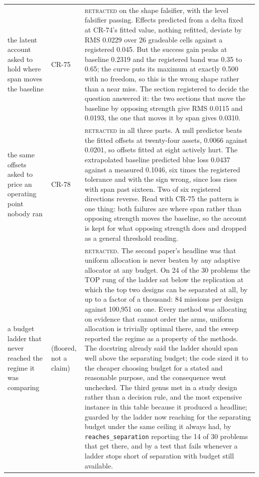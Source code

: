 \begin{tabular}{@{}p{}p{}p{}@{}}
the latent account asked to hold where span moves the baseline & CR-75 & \textsc{retracted} on the shape falsifier, with the level falsifier passing. Effects predicted from a delta fixed at CR-74's fitted value, nothing refitted, deviate by RMS 0.0229 over 26 gradeable cells against a registered 0.045. But the success gain peaks at baseline 0.2319 and the registered band was 0.35 to 0.65; the curve puts its maximum at exactly 0.500 with no freedom, so this is the wrong shape rather than a near miss. The section registered to decide the question answered it: the two sections that move the baseline by opposing strength give RMS 0.0115 and 0.0193, the one that moves it by span gives 0.0310. \\
the same offsets asked to price an operating point nobody ran & CR-78 & \textsc{retracted} in all three parts. A null predictor beats the fitted offsets at twenty-four assets, 0.0066 against 0.0201, so offsets fitted at eight actively hurt. The extrapolated baseline predicted blue loss 0.0437 against a measured 0.1046, six times the registered tolerance and with the sign wrong, since loss rises with span past sixteen. Two of six registered directions reverse. Read with CR-75 the pattern is one thing: both failures are where span rather than opposing strength moves the baseline, so the account is kept for what opposing strength does and dropped as a general threshold reading. \\
a budget ladder that never reached the regime it was comparing & (floored, not a claim) & \textsc{retracted}. The second paper's headline was that uniform allocation is never beaten by any adaptive allocator at any budget. On 24 of the 30 problems the TOP rung of the ladder sat below the replication at which the top two designs can be separated at all, by up to a factor of a thousand: 84 missions per design against 100{,}951 on one. Every method was allocating on evidence that cannot order the arms, uniform allocation is trivially optimal there, and the sweep reported the regime as a property of the methods. The docstring already said the ladder should span well above the separating budget; the code sized it to the cheaper choosing budget for a stated and reasonable purpose, and the consequence went unchecked. The third genus met in a study design rather than a decision rule, and the most expensive instance in this table because it produced a headline; guarded by the ladder now reaching for the separating budget under the same ceiling it always had, by \texttt{reaches\_separation} reporting the 14 of 30 problems that get there, and by a test that fails whenever a ladder stops short of separation with budget still available. \\

\end{tabular}
